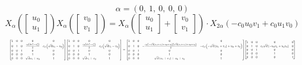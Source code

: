 \documentclass[11pt]{article}
\theoremstyle{definition}
\begin{document}
\[
\alpha = \left( 0, \  1, \  0, \  0, \  0\right)
\]
\[
X_{\alpha}\left(\left[\begin{matrix}u_{0}\\u_{1}\end{matrix}\right]\right) X_{\alpha}\left(\left[\begin{matrix}v_{0}\\v_{1}\end{matrix}\right]\right) = X_{\alpha}\left(\left[\begin{matrix}u_{0}\\u_{1}\end{matrix}\right] + \left[\begin{matrix}v_{0}\\v_{1}\end{matrix}\right]\right) \cdot X_{2\alpha}\left(- c_{0} u_{0} v_{1} + c_{0} u_{1} v_{0}\right)
\]
\[
\resizebox{\textwidth}{!}{${\left[\begin{matrix}1 & 0 & 0 & 0 & 0\\0 & 1 & 0 & \frac{c_{0} \left(d u_{1}^{2} - u_{0}^{2}\right)}{2} & c_{0} \left(\sqrt{d} u_{1} - u_{0}\right)\\0 & 0 & 1 & 0 & 0\\0 & 0 & 0 & 1 & 0\\0 & 0 & 0 & \sqrt{d} u_{1} + u_{0} & 1\end{matrix}\right]} {\left[\begin{matrix}1 & 0 & 0 & 0 & 0\\0 & 1 & 0 & \frac{c_{0} \left(d v_{1}^{2} - v_{0}^{2}\right)}{2} & c_{0} \left(\sqrt{d} v_{1} - v_{0}\right)\\0 & 0 & 1 & 0 & 0\\0 & 0 & 0 & 1 & 0\\0 & 0 & 0 & \sqrt{d} v_{1} + v_{0} & 1\end{matrix}\right]} = {\left[\begin{matrix}1 & 0 & 0 & 0 & 0\\0 & 1 & 0 & - \frac{c_{0} \left(- \sqrt{d} \left(u_{1} + v_{1}\right) + u_{0} + v_{0}\right) \left(\sqrt{d} \left(u_{1} + v_{1}\right) + u_{0} + v_{0}\right)}{2} & - c_{0} \left(- \sqrt{d} \left(u_{1} + v_{1}\right) + u_{0} + v_{0}\right)\\0 & 0 & 1 & 0 & 0\\0 & 0 & 0 & 1 & 0\\0 & 0 & 0 & \sqrt{d} \left(u_{1} + v_{1}\right) + u_{0} + v_{0} & 1\end{matrix}\right]} {\left[\begin{matrix}1 & 0 & 0 & 0 & 0\\0 & 1 & 0 & c_{0} \sqrt{d} \left(- u_{0} v_{1} + u_{1} v_{0}\right) & 0\\0 & 0 & 1 & 0 & 0\\0 & 0 & 0 & 1 & 0\\0 & 0 & 0 & 0 & 1\end{matrix}\right]}$}
\]
\end{document}
